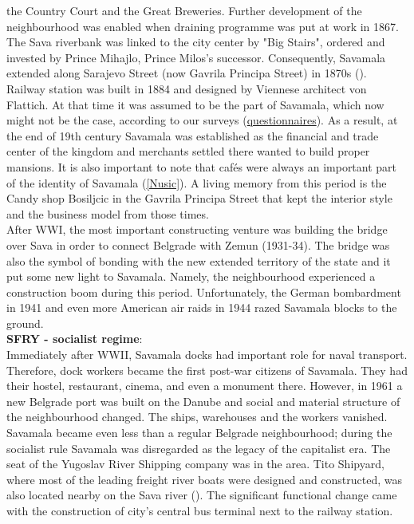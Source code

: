 \documentclass[11pt]{report}
\begin{document}
the Country Court and the Great Breweries.
Further development of the neighbourhood was enabled when draining programme was put at work in 1867.
The Sava riverbank was linked to the city center by "Big Stairs", ordered and invested by Prince Mihajlo, Prince Milos's successor.
Consequently, Savamala extended along Sarajevo Street (now Gavrila Principa Street) in 1870s (\cite{Bureau Savamala}).
Railway station was built in 1884 and designed by Viennese architect von Flattich.
At that time it was assumed to be the part of Savamala, which now might not be the case, according to our surveys (\href{}{questionnaires}).
As a result, at the end of 19th century Savamala was established as the financial and trade center of the kingdom and merchants settled there wanted to build proper mansions.
It is also important to note that cafés were always an important part of the identity of Savamala (\ref{Nusic}). A living memory from this period is the Candy shop Bosiljcic in the Gavrila Principa Street that kept the interior style and the business model from those times.
\\
After WWI, the most important constructing venture was building the bridge over Sava in order to connect Belgrade with Zemun (1931-34). The bridge was also the symbol of bonding with the new extended territory of the state and it put some new light to Savamala.
Namely, the neighbourhood experienced a construction boom during this period. Unfortunately, the German bombardment in 1941 and even more American air raids in 1944 razed Savamala blocks to the ground.
\\
\textbf{SFRY - socialist regime}:
\\
Immediately after WWII, Savamala docks had important role for naval transport.
Therefore, dock workers became the first post-war citizens of Savamala. They had their hostel, restaurant, cinema, and even a monument there.
However, in 1961 a new Belgrade port was built on the Danube and social and material structure of the neighbourhood changed.
The ships, warehouses and the workers vanished.
Savamala became even less than a regular Belgrade neighbourhood; during the socialist rule Savamala was disregarded as the legacy of the capitalist era.
The seat of the Yugoslav River Shipping company was in the area.  Tito Shipyard, where most of the leading freight river boats were designed and constructed, was also located nearby on the Sava river (\cite{ref and Kamenzind2}). 
The significant functional change came with the construction of city's central bus terminal next to the railway station.
\end{document}
